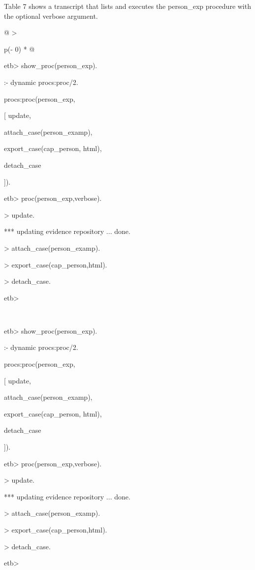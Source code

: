 \documentclass[12pt,twoside,a4paper]{article}
\begin{document}
Table 7 shows a transcript that lists and executes the person\_exp procedure with the optional verbose argument.

\begin{longtable}[]{@{}
  >{\raggedright\arraybackslash}p{(\columnwidth - 0\tabcolsep) * }@{}}
\caption{\protect\hypertarget{_Ref175579287}{}{}Table 7 Running the person\_exp procedure}\tabularnewline
\toprule
\begin{minipage}[b]{\linewidth}\raggedright
etb\textgreater{} show\_proc(person\_exp).

:- dynamic procs:proc/2.

procs:proc(person\_exp,

{[} update,

attach\_case(person\_examp),

export\_case(cap\_person, html),

detach\_case

{]}).

etb\textgreater{} proc(person\_exp,verbose).

\textgreater{} update.

*** updating evidence repository ... done.

\textgreater{} attach\_case(person\_examp).

\textgreater{} export\_case(cap\_person,html).

\textgreater{} detach\_case.

etb\textgreater{}
\end{minipage} \\
\midrule
\endfirsthead
\toprule
\begin{minipage}[b]{\linewidth}\raggedright
etb\textgreater{} show\_proc(person\_exp).

:- dynamic procs:proc/2.

procs:proc(person\_exp,

{[} update,

attach\_case(person\_examp),

export\_case(cap\_person, html),

detach\_case

{]}).

etb\textgreater{} proc(person\_exp,verbose).

\textgreater{} update.

*** updating evidence repository ... done.

\textgreater{} attach\_case(person\_examp).

\textgreater{} export\_case(cap\_person,html).

\textgreater{} detach\_case.

etb\textgreater{}
\end{minipage} \\
\midrule
\endhead
\bottomrule
\end{longtable}
\end{document}
